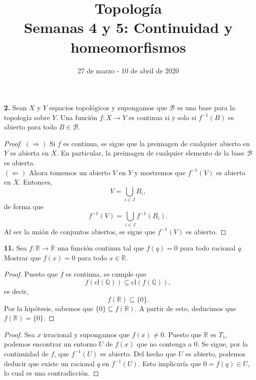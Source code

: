 \documentclass{article}
\begin{document}
\date{27 de marzo - 10 de abril de 2020}
\title{ \textbf{Topología} \\
Semanas 4 y 5: Continuidad y homeomorfismos}
\maketitle	

\begin{mybox}
	\textbf{2. } Sean $X$ y $Y$ espacios topológicos y supongamos que $\mathcal{B}$ es una base para la topología sobre $Y$. Una función $f: X \rightarrow Y$ es continua si y solo si $f^{-1}(B)$ es abierto para todo $B \in \mathcal{B}$.
\end{mybox}	
\begin{proof}
	$(\Rightarrow)$ Si $f$ es continua, se sigue que la preimagen de cualquier abierto en $Y$ es abierta en $X$. En particular, la preimagen de cualquier elemento de la base $\mathcal{B}$ es abierta.\\
	$(\Leftarrow)$ Ahora tomemos un abierto $V$ en $Y$ y mostremos que $f^{-1}(V)$ es abierto en $X$. Entonces,
	$$ V = \bigcup_{i \in J} B_{i} ,$$
	de forma que 
	$$ f^{-1}(V) = \bigcup_{i \in J} f^{-1}(B_{i}) .$$
	Al ser la unión de conjuntos abiertos, se sigue que $f^{-1}(V)$ es abierto. 
\end{proof}

\begin{mybox}
	\textbf{11. } Sea $f: \mathbb{R} \rightarrow \mathbb{R}$ una función continua tal que $f(q) = 0$ para todo racional $q$. Mostrar que $f(x) = 0$ para todo $x \in \mathbb{R}$.  	
\end{mybox}	

\begin{proof}
	Puesto que $f$ es continua, se cumple que 
	$$ f(\text{cl}(\mathbb{Q})) \subseteq \text{cl}(f(\mathbb{Q})), $$
	es decir,
	$$ f(\mathbb{R}) \subseteq \{ 0 \}. $$
	Por la hipótesis, sabemos que $\{0 \} \subseteq f(\mathbb{R})$. A partir de esto, deducimos que $f(\mathbb{R}) = \{ 0 \}$.
\end{proof}

\begin{proof}
	Sea $x$ irracional y supongamos que $f(x) \neq 0$. Puesto que $\mathbb{R}$ es $T_{1}$, podemos encontrar un entorno $U$ de $f(x)$ que no contenga a $0$. Se sigue, por la continuidad de $f$, que $f^{-1}(U)$ es abierto. Del hecho que $U$ es abierto, podemos deducir que existe un racional $q$ en $f^{-1}(U)$. Esto implicaría que $0 = f(q) \in U$, lo cual es una contradicción. 
\end{proof}
\end{document}
